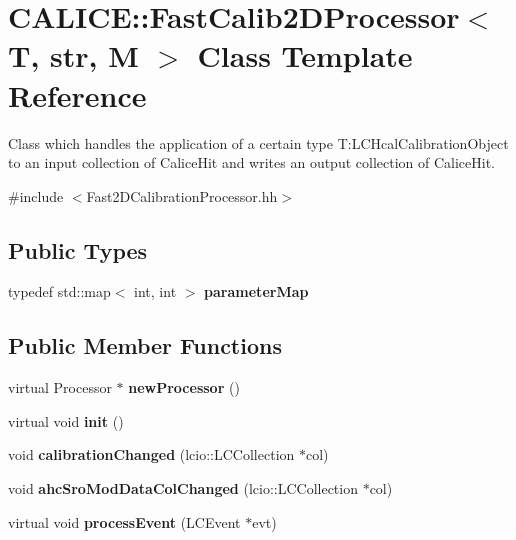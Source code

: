 \section{CALICE::FastCalib2DProcessor$<$ T, str, M $>$ Class Template Reference}
\label{classCALICE_1_1FastCalib2DProcessor}


Class which handles the application of a certain type T:LCHcalCalibrationObject to an input collection of CaliceHit and writes an output collection of CaliceHit.  


{\ttfamily \#include $<$Fast2DCalibrationProcessor.hh$>$}\subsection*{Public Types}
\begin{DoxyCompactItemize}
\item 
typedef std::map$<$ int, int $>$ {\bfseries parameterMap}\label{classCALICE_1_1FastCalib2DProcessor_a1a398176ac86386375acd10b92a890df}

\end{DoxyCompactItemize}
\subsection*{Public Member Functions}
\begin{DoxyCompactItemize}
\item 
virtual Processor $\ast$ {\bfseries newProcessor} ()\label{classCALICE_1_1FastCalib2DProcessor_aba8e344351415f1bfdc0a0ab54173c27}

\item 
virtual void {\bfseries init} ()\label{classCALICE_1_1FastCalib2DProcessor_a6e39f004ac66605fac85eaf3c2303066}

\item 
void {\bfseries calibrationChanged} (lcio::LCCollection $\ast$col)\label{classCALICE_1_1FastCalib2DProcessor_af9b944cab5d25801f3de9538ca58a5fb}

\item 
void {\bfseries ahcSroModDataColChanged} (lcio::LCCollection $\ast$col)\label{classCALICE_1_1FastCalib2DProcessor_ab5ffcf2162e4d6c1356e19637e407c2c}

\item 
virtual void {\bfseries processEvent} (LCEvent $\ast$evt)\label{classCALICE_1_1FastCalib2DProcessor_a9c91ffa8449e011e0f99d9e2334050ee}

\end{DoxyCompactItemize}
